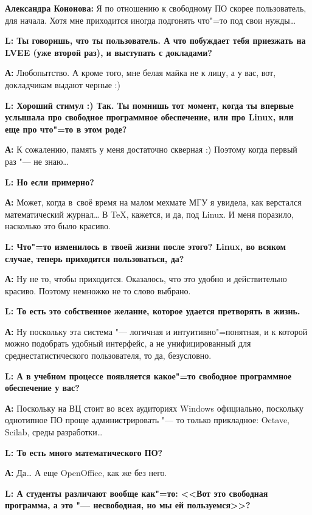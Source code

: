 \documentclass[10pt, a5paper]{article}
\begin{document}
{\noindent \bf Александра Кононова:} Я по отношению к свободному ПО скорее пользователь, для начала. Хотя мне приходится иногда подгонять что"=то под свои нужды\ldots

{\noindent \bf L: Ты говоришь, что ты пользователь. А что побуждает тебя приезжать на LVEE (уже второй раз), и выступать с докладами?}

{\noindent \bf А:} Любопытство. А кроме того, мне белая майка не к лицу, а у вас, вот, докладчикам выдают черные :)

{\noindent \bf L: Хороший стимул :) Так. Ты помнишь тот момент, когда ты впервые услышала про свободное программное обеспечение, или про Linux, или еще про что"=то в этом роде?}

{\noindent \bf А:} К сожалению, память у меня достаточно скверная :) Поэтому когда первый раз "--- не знаю\ldots

{\noindent \bf L: Но если примерно?}

{\noindent \bf А:} Может, когда в~своё время на малом мехмате МГУ я увидела, как верстался математический журнал\ldots{} В \TeX, кажется, и да, под Linux. И меня поразило, насколько это было красиво.

{\noindent \bf L: Что"=то изменилось в твоей жизни после этого? Linux, во всяком случае, теперь приходится пользоваться, да?}

{\noindent \bf А:} Ну не то, чтобы приходится. Оказалось, что это удобно и действительно красиво. Поэтому немножко не то слово выбрано. 

{\noindent \bf L: То есть это собственное желание, которое удается претворять в жизнь.}

{\noindent \bf А:} Ну поскольку эта система "--- логичная и интуитивно"=понятная, и к которой можно подобрать удобный интерфейс, а не унифицированный для среднестатистического пользователя, то да, безусловно. 

{\noindent \bf L: А в учебном процессе появляется какое"=то свободное программное обеспечение у вас?}

{\noindent \bf А:} Поскольку на ВЦ стоит во всех аудиториях Windows официально, поскольку однотипное ПО проще администрировать "--- то только прикладное: Octave, Scilab, среды разработки\ldots

{\noindent \bf L: То есть много математического ПО?}

{\noindent \bf А:} Да\ldots{} А еще OpenOffice, как же без него.

{\noindent \bf L: А студенты различают вообще как"=то: <<Вот это свободная программа, а это "--- несвободная, но мы ей пользуемся>>?}
\end{document}
